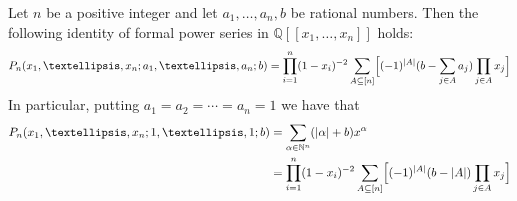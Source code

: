 \documentclass[10pt,a4paper]{amsart}
\newcommand{\Nat}{{\mathbb{N}}}
\newcommand{\Q}{{\mathbb{Q}}}
\newcommand{\tdeg}[1]{\lvert #1 \rvert}
\begin{document}
  \begin{theorem}\label{thm:Pn}
    Let \(n\) be a positive integer and let \(a_1,\dots,a_n,b\) be
    rational numbers. Then
    the following identity of 
    formal power series in \(\Q[[x_1,\dots,x_n]]\) holds:
    \begin{equation}
      \label{eq:2}
      P_n(x_1,\dots,x_n;a_1,\dots,a_n;b) = 
      \prod_{i=1}^n(1-x_i)^{-2} \sum_{A \subseteq [n]} \Bigl[
      (-1)^{\tdeg{A}}(b-\sum_{j \in A} a_j) \prod_{j \in A} x_j \Bigr]
    \end{equation}
    In particular, putting \(a_1=a_2 = \cdots = a_n = 1\) we have that
    \begin{equation}
      \label{eq:1}
      \begin{split}
      P_n(x_1,\dots,x_n;1,\dots,1;b) &=
      \sum_{\alpha \in \Nat^n} (\tdeg{\alpha} + b) x^\alpha \\
      &=
      \prod_{i=1}^n(1-x_i)^{-2} \sum_{A \subseteq [n]} \Bigl[
      (-1)^{\tdeg{A}}(b-\tdeg{A}) \prod_{j \in A} x_j \Bigr]
      \end{split}
    \end{equation}
  \end{theorem}
\end{document}

